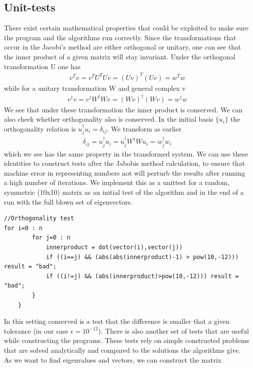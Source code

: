 \documentclass[a4paper,11pt]{article}
\begin{document}
{\subsection{Unit-tests}
There exist certain mathematical properties that could be exploited to make sure the program and the algorithms run correctly. Since the transformations that occur in the Jacobi's method are either orthogonal or unitary, one can see that the inner product of a given matrix will stay invariant. Under the orthogonal transformation U one has
\begin{align}
	v^{T}v = v^T U^T U v = (Uv)^T (Uv) = w^T w
\end{align}
while for a unitary transformation W and general complex v
\begin{align}
	v^\dagger v = v^\dagger W^\dagger W v = (Wv)^\dagger (Wv) = w^\dagger w
\end{align}
We see that under these transformation the inner product is conserved. We can also check whether orthogonality also is conserved. In the initial basis $\{u_i\}$ the orthogonality relation is $u_j^\dagger u_i = \delta_{ij}$. We transform as earlier
\begin{align}
	 \delta_{ij}=u_j^\dagger u_i = u_j^\dagger W^\dagger W u_i = w_j^\dagger w_i
\end{align}
which we see has the same property in the transformed system. We can use these identities to construct tests after the Jabobis method calculation, to ensure that machine error in representing numbers not will perturb the results after running a high number of iterations. We implement this as a unittest for a random, symmetric (10x10) matrix as an initial test of the algorithm and in the end of a run with the full blown set of eigenvectors. 
\begin{lstlisting}
//Orthogonality test   
for i=0 : n
        for j=0 : n
            innerproduct = dot(vector(i),vector(j))
            if ((i==j) && (abs(abs(innerproduct)-1) > pow(10,-12))) result = "bad";
            if ((i!=j) && (abs(innerproduct)>pow(10,-12))) result = "bad";
        }
    }
\end{lstlisting}
In this setting conserved is a test that the difference is smaller that a given tolerance (in our case $\epsilon = 10^{-12}$). There is also another set of tests that are useful while constructing the programs. These tests rely on simple constructed problems that are solved analytically and compared to the solutions the algorithms give. As we want to find eigenvalues and vectors, we can construct the matrix 
}
\end{document}
